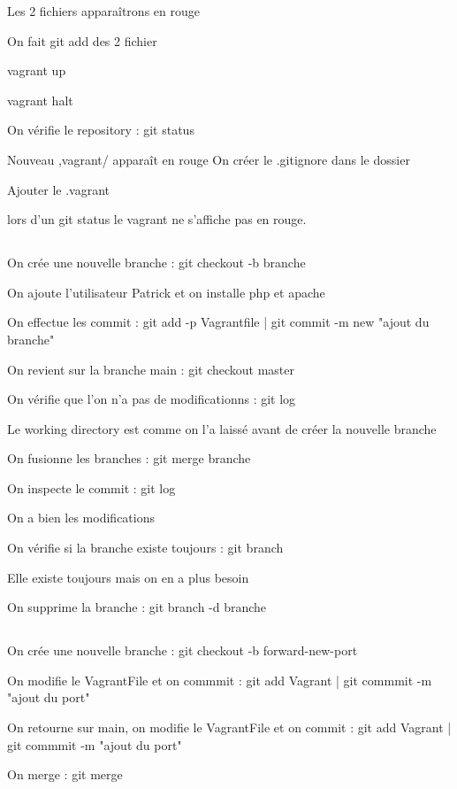 \documentclass{article}
\begin{document}
Les 2 fichiers apparaîtrons en rouge

On fait git add des 2 fichier

vagrant up

vagrant halt

On vérifie le repository : git status 

Nouveau ,vagrant/ apparaît en rouge
On créer le .gitignore dans le dossier

Ajouter le .vagrant 

lors d’un git status le vagrant ne s’affiche pas en rouge.

\subsection{}

On crée une nouvelle branche : git checkout -b branche

On ajoute l'utilisateur Patrick et on installe php et apache

On effectue les commit : git add -p Vagrantfile | git commit -m new "ajout du branche"

On revient sur la branche main : git checkout master

On vérifie que l'on n'a pas de modificationns : git log

Le working directory est comme on l'a laissé avant de créer la nouvelle branche

On fusionne les branches : git merge branche

On inspecte le commit : git log

On a bien les modifications

On vérifie si la branche existe toujours : git branch

Elle existe toujours mais on en a plus besoin

On supprime la branche : git branch -d branche

\subsection{}

On crée une nouvelle branche : git checkout -b forward-new-port

On modifie le VagrantFile et on commmit : git add Vagrant | git commmit -m "ajout du port"

On retourne sur main, on modifie le VagrantFile et on commit : git add Vagrant | git commmit -m "ajout du port"

On merge : git merge
\end{document}
